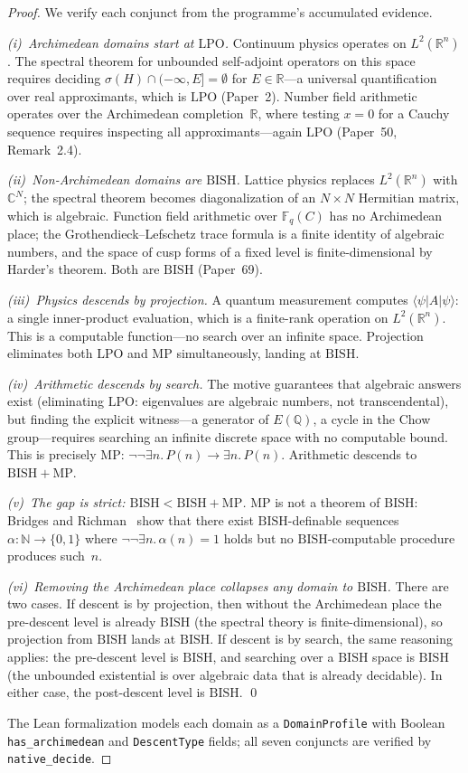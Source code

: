 \documentclass[11pt]{article}
\theoremstyle{definition}
\theoremstyle{remark}
\newcommand{\N}{\mathbb{N}}
\newcommand{\Q}{\mathbb{Q}}
\newcommand{\R}{\mathbb{R}}
\newcommand{\C}{\mathbb{C}}
\newcommand{\Fq}{\mathbb{F}_q}
\newcommand{\BISH}{\mathrm{BISH}}
\newcommand{\LPO}{\mathrm{LPO}}
\newcommand{\MP}{\mathrm{MP}}
\begin{document}
\begin{proof}
We verify each conjunct from the programme's accumulated evidence.

\emph{(i)~Archimedean domains start at $\LPO$.}
Continuum physics operates on $L^2(\R^n)$. The spectral theorem for unbounded self-adjoint operators on this space requires deciding $\sigma(H) \cap (-\infty, E] = \emptyset$ for $E \in \R$---a universal quantification over real approximants, which is $\LPO$ (Paper~2). Number field arithmetic operates over the Archimedean completion~$\R$, where testing $x = 0$ for a Cauchy sequence requires inspecting all approximants---again $\LPO$ (Paper~50, Remark~2.4).

\emph{(ii)~Non-Archimedean domains are $\BISH$.}
Lattice physics replaces $L^2(\R^n)$ with $\C^N$; the spectral theorem becomes diagonalization of an $N \times N$ Hermitian matrix, which is algebraic. Function field arithmetic over $\Fq(C)$ has no Archimedean place; the Grothendieck--Lefschetz trace formula is a finite identity of algebraic numbers, and the space of cusp forms of a fixed level is finite-dimensional by Harder's theorem. Both are $\BISH$ (Paper~69).

\emph{(iii)~Physics descends by projection.}
A quantum measurement computes $\langle \psi | A | \psi \rangle$: a single inner-product evaluation, which is a finite-rank operation on $L^2(\R^n)$. This is a computable function---no search over an infinite space. Projection eliminates both $\LPO$ and $\MP$ simultaneously, landing at $\BISH$.

\emph{(iv)~Arithmetic descends by search.}
The motive guarantees that algebraic answers exist (eliminating $\LPO$: eigenvalues are algebraic numbers, not transcendental), but finding the explicit witness---a generator of $E(\Q)$, a cycle in the Chow group---requires searching an infinite discrete space with no computable bound. This is precisely $\MP$: $\neg\neg\exists n.\, P(n) \to \exists n.\, P(n)$. Arithmetic descends to $\BISH + \MP$.

\emph{(v)~The gap is strict: $\BISH < \BISH + \MP$.}
$\MP$ is not a theorem of $\BISH$: Bridges and Richman~\cite{BridgesRichman} show that there exist $\BISH$-definable sequences $\alpha : \N \to \{0, 1\}$ where $\neg\neg\exists n.\, \alpha(n) = 1$ holds but no $\BISH$-computable procedure produces such~$n$.

\emph{(vi)~Removing the Archimedean place collapses any domain to $\BISH$.}
There are two cases. If descent is by projection, then without the Archimedean place the pre-descent level is already $\BISH$ (the spectral theory is finite-dimensional), so projection from $\BISH$ lands at $\BISH$. If descent is by search, the same reasoning applies: the pre-descent level is $\BISH$, and searching over a $\BISH$ space is $\BISH$ (the unbounded existential is over algebraic data that is already decidable). In either case, the post-descent level is $\BISH$. \qed

The Lean formalization models each domain as a \texttt{DomainProfile} with Boolean \texttt{has\_archimedean} and \texttt{DescentType} fields; all seven conjuncts are verified by \texttt{native\_decide}.
\end{proof}
\end{document}
